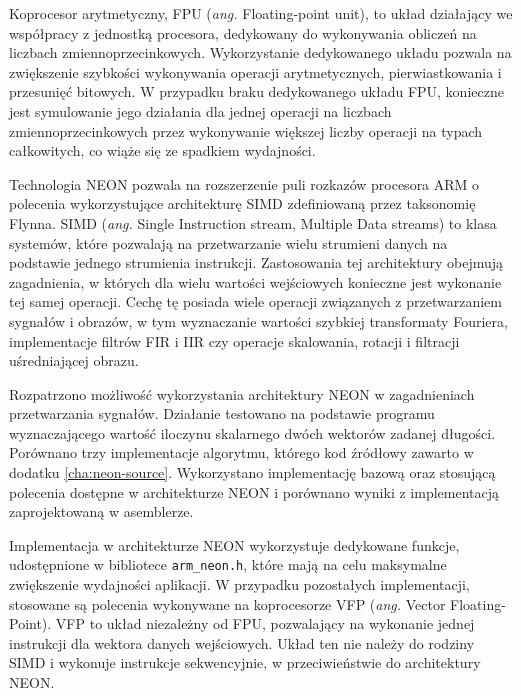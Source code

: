 Koprocesor arytmetyczny, FPU (\emph{ang.} Floating-point unit), to układ działający we współpracy z jednostką procesora, dedykowany do wykonywania obliczeń na liczbach zmiennoprzecinkowych. 
Wykorzystanie dedykowanego układu pozwala na zwiększenie szybkości wykonywania operacji arytmetycznych, pierwiastkowania i przesunięć bitowych. 
W przypadku braku dedykowanego układu FPU, konieczne jest symulowanie jego działania dla jednej operacji na liczbach zmiennoprzecinkowych przez wykonywanie większej liczby operacji na typach całkowitych, co wiąże się ze spadkiem wydajności. %

Technologia NEON pozwala na rozszerzenie puli rozkazów procesora ARM o polecenia wykorzystujące architekturę SIMD zdefiniowaną przez taksonomię Flynna\cite{Flynn1972}.
SIMD (\emph{ang.} Single Instruction stream, Multiple Data streams) to klasa systemów, które pozwalają na przetwarzanie wielu strumieni danych na podstawie jednego strumienia instrukcji. 
Zastosowania tej architektury obejmują zagadnienia, w których dla wielu wartości wejściowych konieczne jest wykonanie tej samej operacji. 
Cechę tę posiada wiele operacji związanych z przetwarzaniem sygnałów i obrazów, w tym  wyznaczanie wartości szybkiej transformaty Fouriera, implementacje filtrów FIR i IIR czy operacje skalowania, rotacji i filtracji uśredniającej obrazu.

Rozpatrzono możliwość wykorzystania architektury NEON w zagadnieniach przetwarzania sygnałów. 
Działanie testowano na podstawie programu wyznaczającego wartość iloczynu skalarnego dwóch wektorów zadanej długości. 
Porównano trzy implementacje algorytmu, którego kod źródłowy zawarto w dodatku \ref{cha:neon-source}.
Wykorzystano implementację bazową oraz stosującą polecenia dostępne w architekturze NEON i porównano wyniki z implementacją zaprojektowaną w asemblerze. %

Implementacja w architekturze NEON wykorzystuje dedykowane funkcje, udostępnione w bibliotece \texttt{arm\_neon.h}, które mają na celu maksymalne zwiększenie wydajności aplikacji. 
W przypadku pozostałych implementacji, stosowane są polecenia wykonywane na koprocesorze VFP (\emph{ang.} Vector Floating-Point). 
VFP to układ niezależny od FPU, pozwalający na wykonanie jednej instrukcji dla wektora danych wejściowych. 
Układ ten nie należy do rodziny SIMD i wykonuje instrukcje sekwencyjnie, w przeciwieństwie do architektury NEON.


